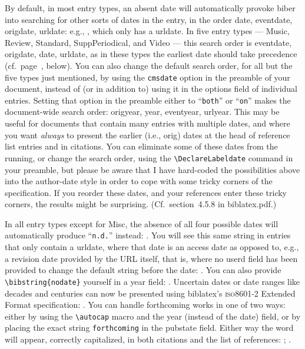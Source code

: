 \documentclass[a4paper,12pt]{article}
\newcommand{\cmd}[1]{\texttt{\textbackslash #1}}
\begin{document}
By default, in most  entry types, an
absent \textsf{date} will automatically provoke \textsf{biber} into
searching for other sorts of dates in the entry, in the order
\textsf{date, eventdate, origdate, urldate}: e.g.,
\autocite{wikiped:bibtex}, which only has a \textsf{urldate}.  In five
entry types --- \textsf{Music}, \textsf{Review}, \textsf{Standard},
\textsf{SuppPeriodical}, and \textsf{Video} --- this search order is
\textsf{eventdate, origdate, date, urldate}, as in these types the
earliest date should take precedence (cf.\
page~\pageref{sec:audiovisual}, below).  You can also change the
default search order, for all but the five types just mentioned, by
using the \texttt{cmsdate} option in the preamble of your document,
instead of (or in addition to) using it in the \textsf{options} field
of individual entries.  Setting that option in the preamble either to
\enquote{\texttt{both}} or \enquote{\texttt{on}} makes the
document-wide search order: \textsf{origyear, year, eventyear,
  urlyear}.  This may be useful for documents that contain many
entries with multiple dates, and where you want \emph{always} to
present the earlier (i.e., \textsf{orig}) dates at the head of
reference list entries and in citations.  You can eliminate some of
these dates from the running, or change the search order, using the
\cmd{DeclareLabeldate} command in your preamble, but please be aware
that I have hard-coded the possibilities above into the author-date
style in order to cope with some tricky corners of the specification.
If you reorder these dates, and your references enter these tricky
corners, the results might be surprising.  (Cf.\ section~4.5.8 in
\textsf{biblatex.pdf}.)

In all entry types except for \textsf{Misc}, the absence of all four
possible dates will automatically produce
\mbox{\enquote{\texttt{n.d.}\hspace{-2pt}}} instead:
\autocite{bernstein:shostakovich}.  You will see this same string in
entries that only contain a \textsf{urldate}, where that date is an
access date as opposed to, e.g., a revision date provided by the URL
itself, that is, where no \textsf{userd} field has been provided to
change the default string before the date:
\autocite{evanston:library}.  You can also provide
\cmd{bibstring\{nodate\}} yourself in a \textsf{year} field:
\autocite{ross:thesis}.  Uncertain dates or date ranges like decades
and centuries can now be presented using \textsf{biblatex's}
\textsc{iso}8601-2 Extended  Format
specification: \autocite{clark:mesopot}.  You can handle forthcoming
works in one of two ways: either by using the \cmd{autocap} macro and
the \textsf{year} (instead of the \textsf{date}) field, or by placing
the exact string \texttt{forthcoming} in the \textsf{pubstate} field.
Either way the word will appear, correctly capitalized, in both
citations and the list of references: \autocite{author:forthcoming};
\autocite{contrib:contrib}.
\end{document}
